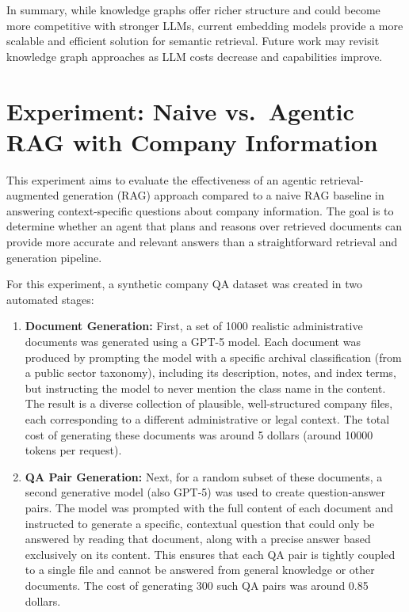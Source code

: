 In summary, while knowledge graphs offer richer structure and could become more competitive with stronger LLMs, current embedding models provide a more scalable and efficient solution for semantic retrieval. Future work may revisit knowledge graph approaches as LLM costs decrease and capabilities improve.

\section{Experiment: Naive vs.\ Agentic RAG with Company Information}
\label{sec:expNaiveVsAgenticRAG}
This experiment aims to evaluate the effectiveness of an agentic retrieval-augmented generation (RAG) approach compared to a naive RAG baseline in answering context-specific questions about company information. The goal is to determine whether an agent that plans and reasons over retrieved documents can provide more accurate and relevant answers than a straightforward retrieval and generation pipeline.

For this experiment, a synthetic company QA dataset was created in two automated stages:
\begin{enumerate}
        \item \textbf{Document Generation:} First, a set of 1000 realistic administrative documents was generated using a GPT-5 model. Each document was produced by prompting the model with a specific archival classification (from a public sector taxonomy), including its description, notes, and index terms, but instructing the model to never mention the class name in the content. The result is a diverse collection of plausible, well-structured company files, each corresponding to a different administrative or legal context. The total cost of generating these documents was around 5 dollars (around 10000 tokens per request).
        \item \textbf{QA Pair Generation:} \label{subsec:qa-generation} Next, for a random subset of these documents, a second generative model (also GPT-5) was used to create question-answer pairs. The model was prompted with the full content of each document and instructed to generate a specific, contextual question that could only be answered by reading that document, along with a precise answer based exclusively on its content. This ensures that each QA pair is tightly coupled to a single file and cannot be answered from general knowledge or other documents. The cost of generating 300 such QA pairs was around 0.85 dollars.
\end{enumerate}

